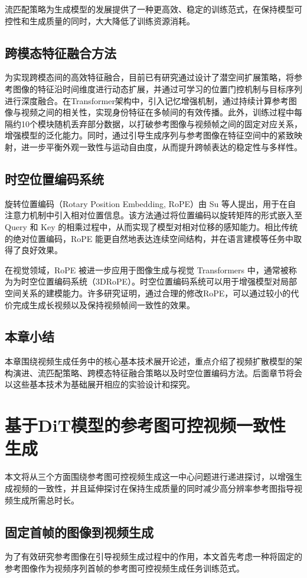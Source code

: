 流匹配策略为生成模型的发展提供了一种更高效、稳定的训练范式，在保持模型可控性和生成质量的同时，大大降低了训练资源消耗。
\subsection{跨模态特征融合方法}
为实现跨模态间的高效特征融合，目前已有研究\cite{huang2025conceptmaster}通过设计了潜空间扩展策略，将参考图像的特征沿时间维度进行动态扩展，并通过可学习的位置门控机制与目标序列进行深度融合。在Transformer架构中，引入记忆增强机制，通过持续计算参考图像与视频之间的相关性，实现身份特征在多帧间的有效传播。此外，训练过程中每隔约10个模块随机丢弃部分数据，以打破参考图像与视频帧之间的固定对应关系，增强模型的泛化能力。同时，通过引导生成序列与参考图像在特征空间中的紧致映射，进一步平衡外观一致性与运动自由度，从而提升跨帧表达的稳定性与多样性。
\subsection{时空位置编码系统}
旋转位置编码（Rotary Position Embedding, RoPE）由 Su\cite{lazos2005rope} 等人提出，用于在自注意力机制中引入相对位置信息。该方法通过将位置编码以旋转矩阵的形式嵌入至 Query 和 Key 的相乘过程中，从而实现了模型对相对位移的感知能力。相比传统的绝对位置编码，RoPE 能更自然地表达连续空间结构，并在语言建模等任务中取得了良好效果。

在视觉领域，RoPE 被进一步应用于图像生成与视觉 Transformers 中，通常被称为为时空位置编码系统（3DRoPE）。时空位置编码系统可以用于增强模型对局部空间关系的建模能力。许多研究证明，通过合理的修改RoPE，可以通过较小的代价完成生成长视频以及保持视频帧间一致性的效果。
\subsection{本章小结}
本章围绕视频生成任务中的核心基本技术展开论述，重点介绍了视频扩散模型的架构演进、流匹配策略、跨模态特征融合策略以及时空位置编码方法。后面章节将会以这些基本技术为基础展开相应的实验设计和探究。

\cleardoublepage

\section{基于DiT模型的参考图可控视频一致性生成}
本文将从三个方面围绕参考图可控视频生成这一中心问题进行递进探讨，以增强生成视频的一致性，并且延伸探讨在保持生成质量的同时减少高分辨率参考图指导视频生成所需总时长。
\subsection{固定首帧的图像到视频生成}\label{sec1}
为了有效研究参考图像在引导视频生成过程中的作用，本文首先考虑一种将固定的参考图像作为视频序列首帧的参考图可控视频生成任务训练范式。

